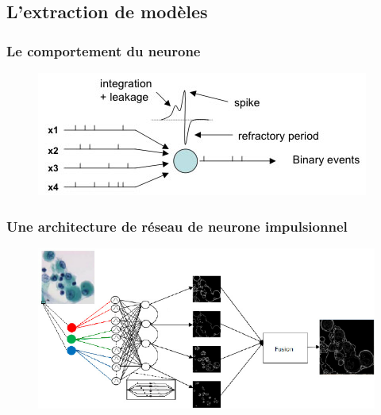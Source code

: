 \documentclass{beamer}
\begin{document}

\subsection{L'extraction de modèles}
\begin{frame}
  \frametitle{Le comportement du neurone}
  \begin{figure}
  	\includegraphics[scale=0.8]{image/neurone.jpg}
  \end{figure}
\end{frame}


\begin{frame}
  \frametitle{Une architecture de réseau de neurone impulsionnel}
  \begin{figure}
    \centering
    \includegraphics[scale=0.5]{image/SNN1.png}
  \end{figure}
\end{frame}

\end{document}
